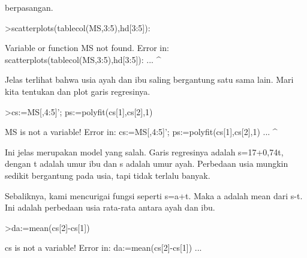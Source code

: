 \documentclass[a4paper,10pt]{article}
\begin{document}
\begin{eulernotebook}
\begin{eulercomment}
\begin{eulercomment}
\begin{eulercomment}
\begin{eulercomment}
\begin{eulercomment}
\begin{eulercomment}
\begin{eulercomment}
\begin{eulercomment}
\begin{eulercomment}
\begin{eulercomment}
\begin{eulercomment}
\begin{eulercomment}
\begin{eulercomment}
\begin{eulercomment}
\begin{eulercomment}
\begin{eulercomment}
\begin{eulercomment}
\begin{eulercomment}
\begin{eulercomment}
\begin{eulercomment}
\begin{eulercomment}
\begin{eulercomment}
\begin{eulercomment}
\begin{eulercomment}
\begin{eulercomment}
\begin{eulercomment}
\begin{eulercomment}
\begin{eulercomment}
\begin{eulercomment}
\begin{eulercomment}
\begin{eulercomment}
\begin{eulercomment}
\begin{eulercomment}
\begin{eulercomment}
\begin{eulercomment}
\begin{eulercomment}
\begin{eulercomment}
\begin{eulercomment}
\begin{eulercomment}
\begin{eulercomment}
\begin{eulercomment}
\begin{eulercomment}
\begin{eulercomment}
\begin{eulercomment}
\begin{eulercomment}
\begin{eulercomment}
\begin{eulercomment}
\begin{eulercomment}
\begin{eulercomment}
\begin{eulercomment}
\begin{eulercomment}
\begin{eulercomment}
\begin{eulercomment}
\begin{eulercomment}
\begin{eulercomment}
\begin{eulercomment}
\begin{eulercomment}
\begin{eulercomment}
\begin{eulercomment}
\begin{eulercomment}
\begin{eulercomment}
\begin{eulercomment}
\begin{eulercomment}
\begin{eulercomment}
\begin{eulercomment}
\begin{eulercomment}
\begin{eulercomment}
berpasangan.
\end{eulercomment}
\begin{eulerprompt}
>scatterplots(tablecol(MS,3:5),hd[3:5]):
\end{eulerprompt}
\begin{euleroutput}
  Variable or function MS not found.
  Error in:
  scatterplots(tablecol(MS,3:5),hd[3:5]): ...
                          ^
\end{euleroutput}
\begin{eulercomment}
Jelas terlihat bahwa usia ayah dan ibu saling bergantung satu sama
lain. Mari kita tentukan dan plot garis regresinya.
\end{eulercomment}
\begin{eulerprompt}
>cs:=MS[,4:5]'; ps:=polyfit(cs[1],cs[2],1)
\end{eulerprompt}
\begin{euleroutput}
  MS is not a variable!
  Error in:
  cs:=MS[,4:5]'; ps:=polyfit(cs[1],cs[2],1) ...
              ^
\end{euleroutput}
\begin{eulercomment}
Ini jelas merupakan model yang salah. Garis regresinya adalah
s=17+0,74t, dengan t adalah umur ibu dan s adalah umur ayah. Perbedaan
usia mungkin sedikit bergantung pada usia, tapi tidak terlalu banyak.

Sebaliknya, kami mencurigai fungsi seperti s=a+t. Maka a adalah mean
dari s-t. Ini adalah perbedaan usia rata-rata antara ayah dan ibu.
\end{eulercomment}
\begin{eulerprompt}
>da:=mean(cs[2]-cs[1])
\end{eulerprompt}
\begin{euleroutput}
  cs is not a variable!
  Error in:
  da:=mean(cs[2]-cs[1]) ...
                
\end{euleroutput}
\end{eulercomment}
\end{eulercomment}
\end{eulercomment}
\end{eulercomment}
\end{eulercomment}
\end{eulercomment}
\end{eulercomment}
\end{eulercomment}
\end{eulercomment}
\end{eulercomment}
\end{eulercomment}
\end{eulercomment}
\end{eulercomment}
\end{eulercomment}
\end{eulercomment}
\end{eulercomment}
\end{eulercomment}
\end{eulercomment}
\end{eulercomment}
\end{eulercomment}
\end{eulercomment}
\end{eulercomment}
\end{eulercomment}
\end{eulercomment}
\end{eulercomment}
\end{eulercomment}
\end{eulercomment}
\end{eulercomment}
\end{eulercomment}
\end{eulercomment}
\end{eulercomment}
\end{eulercomment}
\end{eulercomment}
\end{eulercomment}
\end{eulercomment}
\end{eulercomment}
\end{eulercomment}
\end{eulercomment}
\end{eulercomment}
\end{eulercomment}
\end{eulercomment}
\end{eulercomment}
\end{eulercomment}
\end{eulercomment}
\end{eulercomment}
\end{eulercomment}
\end{eulercomment}
\end{eulercomment}
\end{eulercomment}
\end{eulercomment}
\end{eulercomment}
\end{eulercomment}
\end{eulercomment}
\end{eulercomment}
\end{eulercomment}
\end{eulercomment}
\end{eulercomment}
\end{eulercomment}
\end{eulercomment}
\end{eulercomment}
\end{eulercomment}
\end{eulercomment}
\end{eulercomment}
\end{eulercomment}
\end{eulercomment}
\end{eulercomment}
\end{eulernotebook}
\end{document}
